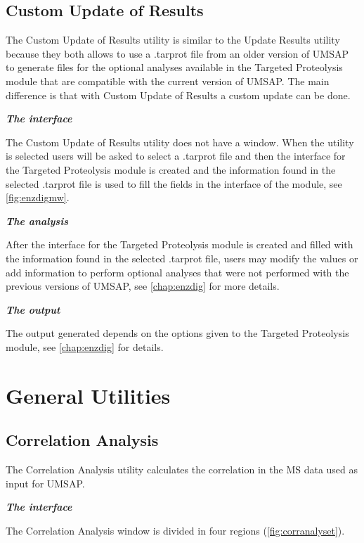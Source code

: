 \subsection{Custom Update of Results }
\label{subsec:reanalyzetarprot}

The Custom Update of Results utility is similar to the Update Results utility because they both allows to use  a .tarprot file from an older version of UMSAP to generate files for the optional analyses available in the Targeted Proteolysis module that are compatible with the current version of UMSAP. The main difference is that with Custom Update of Results a custom update can be done.

\textit{\textbf{The interface}}

The Custom Update of Results utility does not have a window. When the utility is selected users will be asked to select a .tarprot file and then the interface for the Targeted Proteolysis module is created and the information found in the selected .tarprot file is used to fill the fields in the interface of the module, see \autoref{fig:enzdigmw}.

\textit{\textbf{The analysis}}

After the interface for the Targeted Proteolysis module is created and filled with the information found in the selected .tarprot file, users may modify the values or add information to perform optional analyses that were not performed with the previous versions of UMSAP, see \autoref{chap:enzdig} for more details.

\textit{\textbf{The output}}    

The output generated depends on the options given to the Targeted Proteolysis module, see \autoref{chap:enzdig} for details.

\section{General Utilities}

\subsection{Correlation Analysis}

The Correlation Analysis utility calculates the correlation in the MS data used as input for UMSAP.

\textit{\textbf{The interface}}

The Correlation Analysis window is divided in four regions (\autoref{fig:corranalyset}). 

